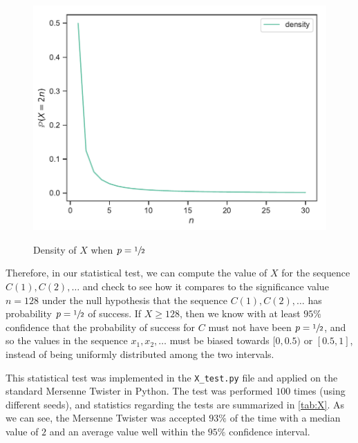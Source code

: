 \documentclass{article}
\renewcommand{\geq}{\geqslant}
\begin{document}
\begin{enumerate}
        \begin{figure}[H]
            \centering
            \caption{Density of $X$ when $p = \sfrac{1}{2}$}
            \includegraphics[scale=1]{../figures/X.pdf}
            \label{fig:density-X}
        \end{figure}

        Therefore, in our statistical test, we can compute the value of $X$ for the sequence $C(1), C(2), \dots$
        and check to see how it compares to the significance value $n = 128$ under the
        null hypothesis that the sequence $C(1), C(2), \dots$ has probability $p = \sfrac{1}{2}$ of success.
        If $X \geq 128$, then we know with at least $95\%$ confidence that the probability of success for $C$ must not have been $p = \sfrac{1}{2}$,
        and so the values in the sequence $x_1, x_2, \dots$ must be biased towards $[0, 0.5)$ or $[0.5, 1]$, instead of being uniformly distributed among the two intervals.

        This statistical test was implemented in the \texttt{X\_test.py} file and applied on the standard Mersenne Twister in Python.
        The test was performed $100$ times (using different seeds), and statistics regarding the tests are summarized in \autoref{tab:X}.
        As we can see, the Mersenne Twister was accepted $93\%$ of the time with a median value of $2$ and an average value well within the $95\%$ confidence interval.


\end{enumerate}
\end{document}

